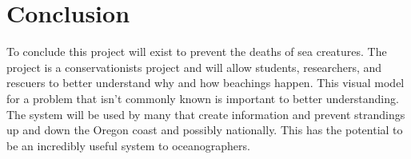 \documentclass[onecolumn, draftclsnofoot,10pt, compsoc]{IEEEtran}
\begin{document}
      \section{Conclusion}
          To conclude this project will exist to prevent the deaths of sea creatures. The project is a conservationists project and will allow students, researchers, and rescuers to better understand why and how beachings happen. This visual model for a problem that isn't commonly known is important to better understanding. The system will be used by many that create information and prevent strandings up and down the Oregon coast and possibly nationally. This has the potential to be an incredibly useful system to oceanographers.

        
        
\end{document}
